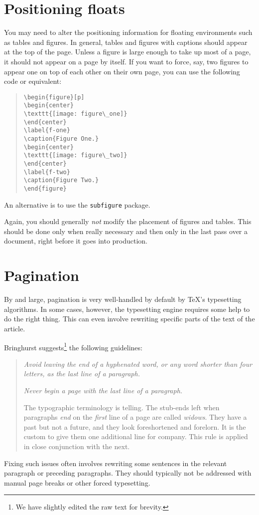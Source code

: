 \documentclass[openany]{now} %
\begin{document}
\section{Positioning floats}

You may need to alter the positioning information for floating
environments such as tables and figures. In general, tables and figures with
captions should appear at the top of the page. Unless a figure is large enough
to take up most of a page, it should not appear on a page by itself. If you
want to force, say, two figures to appear one on top of each other on
their own page, you can use the following code or equivalent:
\begin{quote}
\begin{verbatim}
\begin{figure}[p]
\begin{center}
\texttt{[image: figure\_one]}
\end{center}
\label{f-one}
\caption{Figure One.}
\begin{center}
\texttt{[image: figure\_two]}
\end{center}
\label{f-two}
\caption{Figure Two.}
\end{figure}
\end{verbatim}
\end{quote}
An alternative is to use the \texttt{subfigure} package.

Again, you should generally \emph{not} modify the placement of
figures and tables. This should be done only when really necessary 
and then only in the last pass over a document, right before it goes
into production.

\section{Pagination}

By and large, pagination is very well-handled by default by
\TeX's typesetting algorithms. In some cases, however, the typesetting
engine requires some help to do the right thing. This can even involve
rewriting specific parts of the text of the article. 

Bringhurst suggests\footnote{We have slightly
edited the raw text for brevity.} the following guidelines:
\begin{quote}
    \emph{Avoid leaving the end of a hyphenated word, or any
    word shorter than four letters, as the last line of a paragraph.}

    \emph{Never begin a page with the last line of a paragraph.}

    The typographic terminology is telling. The stub-ends left when paragraphs
    \emph{end} on the \emph{first} line of a page are called \emph{widows}.
    They have a past but not a future, and they look foreshortened and
    forelorn.  It is the custom to give them one additional line for company.
    This rule is applied in close conjunction with the next.  
\end{quote}
Fixing such issues often involves rewriting some sentences in the relevant
paragraph or preceding paragraphs. They should typically not be addressed
with manual page breaks or other forced typesetting.
\end{document}

